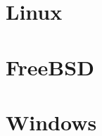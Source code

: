 \documentclass[letterpaper,draftclsnofoot,10pt,onecolumn,titlepage]{IEEEtran}\usepackage[margin=0.75in]{geometry}
\begin{document}
\section{Linux}


\section{FreeBSD}


\section{Windows}
\end{document}
